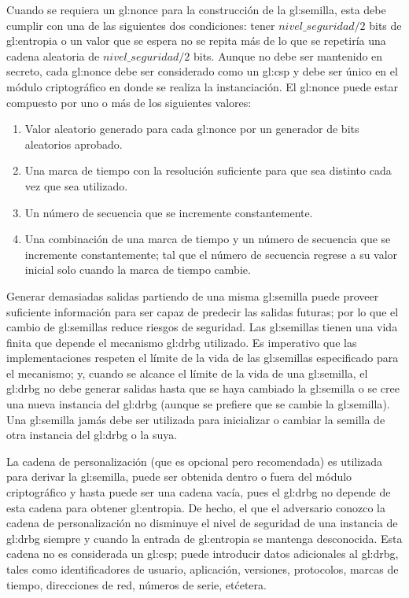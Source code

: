 Cuando se requiera un \gls{gl:nonce} para la construcción de la
\gls{gl:semilla}, esta debe cumplir con una de las siguientes dos condiciones:
tener $nivel\_seguridad/2$ bits de \gls{gl:entropia} o un valor que se espera
no se repita más de lo que se repetiría una cadena aleatoria de
$nivel\_seguridad/2$ bits. Aunque no debe ser mantenido en secreto, cada
\gls{gl:nonce} debe ser considerado como un \gls{gl:csp} y debe ser único en
el módulo criptográfico en donde se realiza la instanciación. El \gls{gl:nonce}
puede estar compuesto por uno o más de los siguientes valores:
\begin{enumerate}
  \item Valor aleatorio generado para cada \gls{gl:nonce} por un generador
    de bits aleatorios aprobado.
  \item Una marca de tiempo con la resolución suficiente para que sea distinto
    cada vez que sea utilizado.
  \item Un número de secuencia que se incremente constantemente.
  \item Una combinación de una marca de tiempo y un número de secuencia que se
    incremente constantemente; tal que el número de secuencia regrese a su
    valor inicial solo cuando la marca de tiempo cambie.
\end{enumerate}

Generar demasiadas salidas partiendo de una misma \gls{gl:semilla} puede proveer
suficiente información para ser capaz de predecir las salidas futuras; por lo
que el cambio de \glspl{gl:semilla} reduce riesgos de seguridad. Las
\glspl{gl:semilla} tienen una vida finita que depende el mecanismo \gls{gl:drbg}
utilizado. Es imperativo que las implementaciones respeten el límite de la vida
de las \glspl{gl:semilla} especificado para el mecanismo; y, cuando se alcance
el límite de la vida de una \gls{gl:semilla}, el \gls{gl:drbg} no debe generar
salidas hasta que se haya cambiado la \gls{gl:semilla} o se cree una nueva
instancia del \gls{gl:drbg} (aunque se prefiere que se cambie la
\gls{gl:semilla}). Una \gls{gl:semilla} jamás debe ser utilizada para
inicializar o cambiar la semilla de otra instancia del \gls{gl:drbg} o la suya.

La cadena de personalización (que es opcional pero recomendada) es utilizada
para derivar la \gls{gl:semilla}, puede ser obtenida dentro o fuera del
módulo criptográfico y hasta puede ser una cadena vacía, pues el \gls{gl:drbg}
no depende de esta cadena para obtener \gls{gl:entropia}. De hecho, el que
el adversario conozco la cadena de personalización no disminuye el nivel de
seguridad de una instancia de \gls{gl:drbg} siempre y cuando la entrada de
\gls{gl:entropia} se mantenga desconocida. Esta cadena no es considerada un
\gls{gl:csp}; puede introducir datos adicionales al \gls{gl:drbg}, tales como
identificadores de usuario, aplicación, versiones, protocolos, marcas de tiempo,
direcciones de red, números de serie, etćetera.